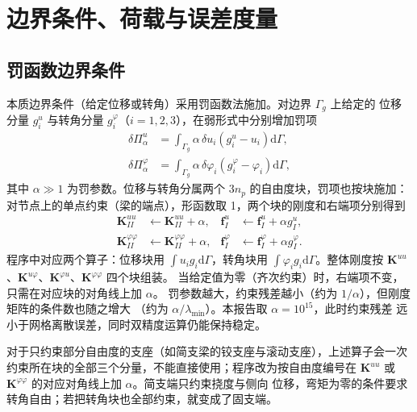 \documentclass[UTF8,a4paper,11pt]{ctexart}
\newcommand{\ud}{\mathrm{d}}
\newcommand{\bK}{\mathbf{K}}
\newcommand{\bff}{\mathbf{f}}
\begin{document}
\section{边界条件、荷载与误差度量}

\subsection{罚函数边界条件}

本质边界条件（给定位移或转角）采用罚函数法施加。对边界 $\Gamma_g$ 上给定的
位移分量 $g_i^{u}$ 与转角分量 $g_i^{\varphi}$（$i=1,2,3$），在弱形式中分别增加罚项
\begin{equation}\label{eq:penalty}
\begin{aligned}
\delta\Pi_\alpha^{u}&=\int_{\Gamma_g}\alpha\,\delta u_i\left(g_i^{u}-u_i\right)\ud\Gamma,\\
\delta\Pi_\alpha^{\varphi}&=\int_{\Gamma_g}\alpha\,\delta\varphi_i\left(g_i^{\varphi}-\varphi_i\right)\ud\Gamma,
\end{aligned}
\end{equation}
其中 $\alpha\gg1$ 为罚参数。位移与转角分属两个 $3n_p$ 的自由度块，罚项也按块施加：
对节点上的单点约束（梁的端点），形函数取 1，两个块的刚度和右端项分别得到
\begin{equation}\label{eq:penalty-disc}
\begin{aligned}
\bK^{uu}_{II}&\leftarrow\bK^{uu}_{II}+\alpha, &
\bff^{u}_I&\leftarrow\bff^{u}_I+\alpha g^{u}_I,\\
\bK^{\varphi\varphi}_{II}&\leftarrow\bK^{\varphi\varphi}_{II}+\alpha, &
\bff^{\varphi}_I&\leftarrow\bff^{\varphi}_I+\alpha g^{\varphi}_I.
\end{aligned}
\end{equation}
程序中对应两个算子：位移块用 $\int u_i g_i\ud\Gamma$，转角块用
$\int\varphi_i g_i\ud\Gamma$。整体刚度按
$\bK^{uu}$、$\bK^{u\varphi}$、$\bK^{\varphi u}$、$\bK^{\varphi\varphi}$ 四个块组装。
当给定值为零（齐次约束）时，右端项不变，只需在对应块的对角线上加 $\alpha$。
罚参数越大，约束残差越小（约为 $1/\alpha$），但刚度矩阵的条件数也随之增大
（约为 $\alpha/\lambda_{\min}$）。本报告取 $\alpha=10^{15}$，此时约束残差
远小于网格离散误差，同时双精度运算仍能保持稳定。

对于只约束部分自由度的支座（如简支梁的铰支座与滚动支座），上述算子会一次
约束所在块的全部三个分量，不能直接使用；程序改为按自由度编号在 $\bK^{uu}$
或 $\bK^{\varphi\varphi}$ 的对应对角线上加 $\alpha$。简支端只约束挠度与侧向
位移，弯矩为零的条件要求转角自由；若把转角块也全部约束，就变成了固支端。
\end{document}
